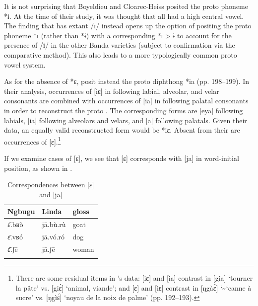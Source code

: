 \documentclass[output=paper,colorlinks,citecolor=brown]{langscibook}
\begin{document}
It is not surprising that Boyeldieu and Cloarec-Heiss posited the proto phoneme *ɨ. At the time of their study, it was thought that all  had a high central vowel. The finding that  has extant /ɪ/ instead opens up the option of positing the proto phoneme *ɪ (rather than *ɨ) with a corresponding  *ɪ > ɨ to account for the presence of /ɨ/ in the other Banda  varieties (subject to confirmation via the comparative method). This also leads to a more typologically  common proto vowel system.

\begin{sloppypar}
As for the absence of *ɛ, \citeauthor{BoyeldieuCloarec-Heiss2001} posit instead the proto diphthong *ia (pp. 198--199). In their analysis, occurrences of [iɛ] in  following labial, alveolar, and velar consonants are combined with occurrences of [ia] in  following palatal consonants in order to reconstruct the proto . The corresponding  forms are [eya] following labials, [ia] following alveolars and velars, and [a] following palatals. Given their data, an equally valid reconstructed form would be *iɛ. Absent from their  are occurrences of [ɛ].\footnote{There are some residual items in \citeauthor{BoyeldieuCloarec-Heiss2001}'s data: [iɛ] and [ia] contrast in [gia] ‘tourner la pâte’ vs. [giɛ̀] ‘animal, viande’; and [ɛ] and [iɛ] contrast in [ŋgàɛ̀] \char`\~ \space [ŋgɛ̀] ‘canne à sucre’ vs. [ŋgìɛ́] ‘noyau de la noix de palme’ (pp. 192--193).}
\end{sloppypar}

If we examine cases of [ɛ], we see that  [ɛ] corresponds with  [ja] \citep{Moñino1988} in word-initial position, as shown in .

\begin{table}
\caption{Correspondences between  [ɛ] and  [ja]\label{tab:olson:13}}
    \begin{tabular}{lll}
    \lsptoprule
        Ngbugu & Linda & gloss\\
    \midrule
        ɛ̄.bʁò       & jā.bù.rù  & goat\\
        ɛ̄.vʁó       & jā.vó.ró & dog\\
        ɛ̄.ʃē        & jā.ʃē    & woman\\
    \lspbottomrule
 \end{tabular}
\end{table}
\end{document}
